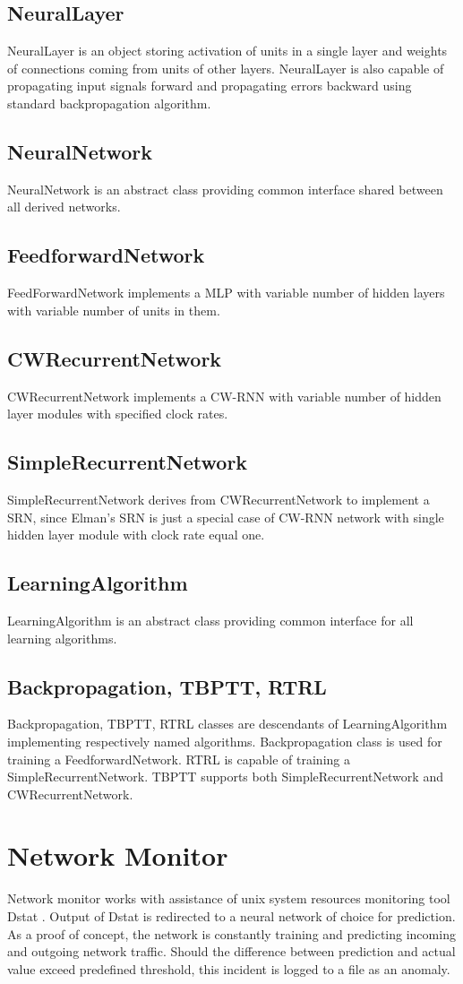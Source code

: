 \documentclass[12pt,oneside]{fithesis2}
\begin{document}
\subsection{NeuralLayer}
NeuralLayer is an object storing activation of units in a single layer and weights of connections coming from units of other layers. NeuralLayer is also capable of propagating input signals forward and propagating errors backward using standard backpropagation algorithm.
\subsection{NeuralNetwork}
NeuralNetwork is an abstract class providing common interface shared between all derived networks.
\subsection{FeedforwardNetwork}
FeedForwardNetwork implements a MLP with variable number of hidden layers with variable number of units in them.
\subsection{CWRecurrentNetwork}
CWRecurrentNetwork implements a CW-RNN with variable number of hidden layer modules with specified clock rates.
\subsection{SimpleRecurrentNetwork}
SimpleRecurrentNetwork derives from CWRecurrentNetwork to implement a SRN, since Elman's SRN is just a special case of CW-RNN network with single hidden layer module with clock rate equal one.
\subsection{LearningAlgorithm}
LearningAlgorithm is an abstract class providing common interface for all learning algorithms.
\subsection{Backpropagation, TBPTT, RTRL}
Backpropagation, TBPTT, RTRL classes are descendants of LearningAlgorithm implementing respectively named algorithms. Backpropagation class is used for training a FeedforwardNetwork. RTRL is capable of training a SimpleRecurrentNetwork. TBPTT supports both SimpleRecurrentNetwork and CWRecurrentNetwork.

\section{Network Monitor}
Network monitor works with assistance of unix system resources monitoring tool Dstat \cite{dstat}. Output of Dstat is redirected to a neural network of choice for prediction. As a proof of concept, the network is constantly training and predicting incoming and outgoing network traffic. Should the difference between prediction and actual value exceed predefined threshold, this incident is logged to a file as an anomaly.
\end{document}
